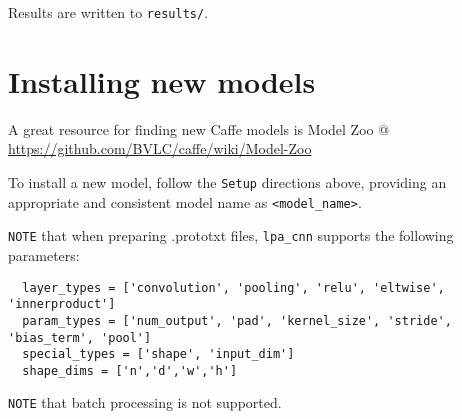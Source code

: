 \documentclass[]{article}
\begin{document}
Results are written to \texttt{results/}.

\section{Installing new
models}\label{installing-new-models}

A great resource for finding new Caffe models is Model Zoo @
\url{https://github.com/BVLC/caffe/wiki/Model-Zoo}

To install a new model, follow the \texttt{Setup} directions above,
providing an appropriate and consistent model name as
\texttt{\textless{}model\_name\textgreater{}}.

\texttt{NOTE} that when preparing .prototxt files, \texttt{lpa\_cnn}
supports the following parameters:

\begin{verbatim}
  layer_types = ['convolution', 'pooling', 'relu', 'eltwise', 'innerproduct']
  param_types = ['num_output', 'pad', 'kernel_size', 'stride', 'bias_term', 'pool']
  special_types = ['shape', 'input_dim']
  shape_dims = ['n','d','w','h']
\end{verbatim}

\texttt{NOTE} that batch processing is not supported.
\end{document}
